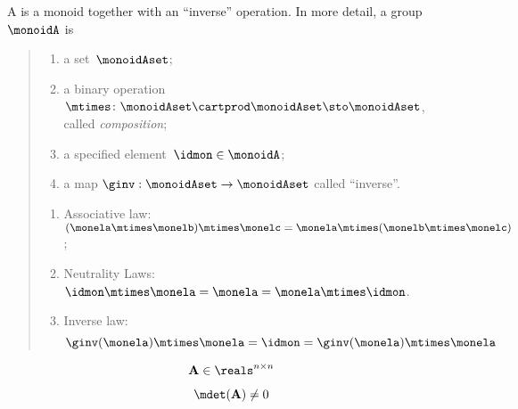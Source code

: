 

\section{}\label{sec:groups}


\begin{ctdefinition}[Group]
  \label{def:group}
  A \emph{} is a monoid together with an ``inverse'' operation.
  In more detail, a group $\monoidA$ is
  \begin{quote}
    \constit
    \begin{enumerate}
      \item a set~$\monoidAset$;
      \item a binary operation~$\mtimes \colon \monoidAset \cartprod \monoidAset \sto \monoidAset$, called \emph{composition};
      \item a specified element~$\idmon\in \monoidA$;
      \item a map $\ginv: \monoidAset \to \monoidAset$ called ``inverse''.
    \end{enumerate}
    \condit
    \begin{enumerate}
      \item Associative law:~$(\monela\mtimes \monelb)\mtimes \monelc=\monela\mtimes (\monelb\mtimes \monelc)$;
      \item Neutrality Laws:~$\idmon\mtimes \monela=\monela=\monela \mtimes \idmon$.
      \item Inverse law:
      \begin{equation}\label{eq:group-inverse-law}
        \ginv(\monela) \mtimes \monela = \idmon = \ginv(\monela) \mtimes \monela
      \end{equation}
    \end{enumerate}
  \end{quote}
\end{ctdefinition}




\begin{equation} \label{eq:group-fullrank-issquare}
    \mathbf{A} \in \reals^{n\times n}
\end{equation}

\begin{equation} \label{eq:group-fullrank-isfullrank}
   \mdet(\mathbf{A}) \neq 0
\end{equation}



